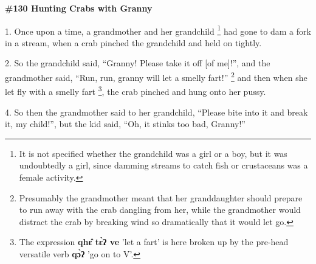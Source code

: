 
\textbf{\#130 Hunting Crabs with Granny}

1. Once upon a time, a grandmother and her grandchild \footnote{It is not specified whether the grandchild was a girl or a boy, but it was undoubtedly a girl, since damming streams to catch fish or crustaceans was a female activity.} had gone to dam a fork
in a stream, when a crab pinched the grandchild and held on tightly.

2. So the grandchild said, ``Granny! Please take it off [of me]!'', and the grandmother
said, ``Run, run, granny will let a smelly fart!'' \footnote{Presumably the grandmother meant that her granddaughter should prepare to run away with the crab dangling from her, while the grandmother would distract the crab by breaking wind so dramatically that it would let go.} and then when she let fly
with a smelly fart \footnote{The expression \textbf{qhɛ̂ tɛ̀ʔ ve}  'let a fart' is here broken up by the pre-head versatile verb  \textbf{qɔ̀ʔ} 'go on to V'.}, the crab pinched and hung onto her pussy.

4. So then the grandmother said to her grandchild, ``Please bite into it and break
it, my child!'', but the kid said, ``Oh, it stinks too bad, Granny!''

